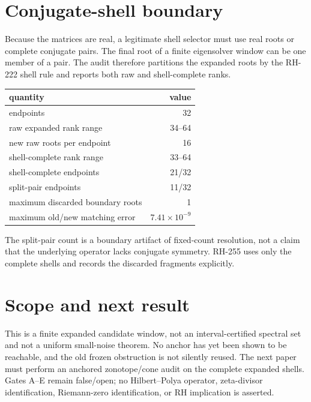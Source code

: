 \documentclass[11pt]{article}
\theoremstyle{remark}
\begin{document}
\section{Conjugate-shell boundary}

Because the matrices are real, a legitimate shell selector must use real roots
or complete conjugate pairs.  The final root of a finite eigensolver window can
be one member of a pair.  The audit therefore partitions the expanded roots by
the RH-222 shell rule and reports both raw and shell-complete ranks.

\begin{center}
\small
\begin{tabular}{lr}
\toprule
quantity & value\\
\midrule
endpoints & 32\\
raw expanded rank range & 34--64\\
new raw roots per endpoint & 16\\
shell-complete rank range & 33--64\\
shell-complete endpoints & 21/32\\
split-pair endpoints & 11/32\\
maximum discarded boundary roots & 1\\
maximum old/new matching error & $7.41\times10^{-9}$\\
\bottomrule
\end{tabular}
\end{center}

The split-pair count is a boundary artifact of fixed-count resolution, not a
claim that the underlying operator lacks conjugate symmetry.  RH-255 uses only
the complete shells and records the discarded fragments explicitly.

\section{Scope and next result}

This is a finite expanded candidate window, not an interval-certified spectral
set and not a uniform small-noise theorem.  No anchor has yet been shown to be
reachable, and the old frozen obstruction is not silently reused.  The next
paper must perform an anchored zonotope/cone audit on the complete expanded
shells.  Gates A--E remain false/open; no Hilbert--Polya operator, zeta-divisor
identification, Riemann-zero identification, or RH implication is asserted.



\end{document}
